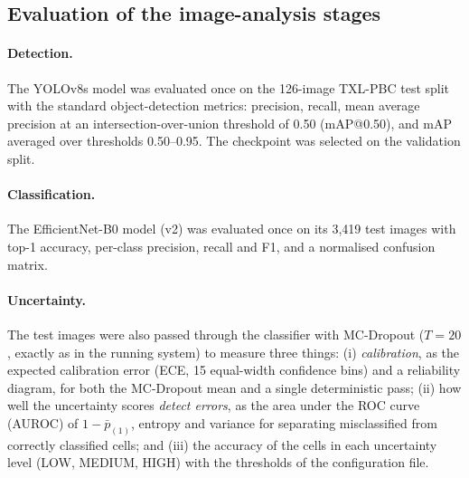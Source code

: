 \noindent{}

\subsection{Evaluation of the image-analysis stages}

\paragraph{Detection.} The YOLOv8s model was evaluated once on the 126-image TXL-PBC test split with the standard object-detection metrics: precision, recall, mean average precision at an intersection-over-union threshold of 0.50 (mAP@0.50), and mAP averaged over thresholds 0.50--0.95. The checkpoint was selected on the validation split.

\paragraph{Classification.} The EfficientNet-B0 model (v2) was evaluated once on its 3{,}419 test images with top-1 accuracy, per-class precision, recall and F1, and a normalised confusion matrix.

\paragraph{Uncertainty.} The test images were also passed through the classifier with MC-Dropout ($T = 20$, exactly as in the running system) to measure three things: (i) \emph{calibration}, as the expected calibration error (ECE, 15 equal-width confidence bins) and a reliability diagram, for both the MC-Dropout mean and a single deterministic pass; (ii) how well the uncertainty scores \emph{detect errors}, as the area under the ROC curve (AUROC) of $1-\bar{p}_{(1)}$, entropy and variance for separating misclassified from correctly classified cells; and (iii) the accuracy of the cells in each uncertainty level (LOW, MEDIUM, HIGH) with the thresholds of the configuration file.

